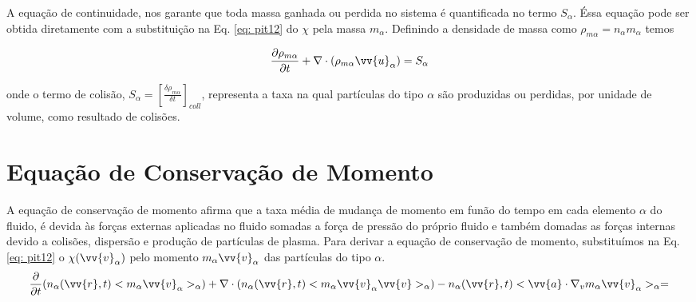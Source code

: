 \documentclass[12pt,oneside,a4paper]{abntex2}
\theoremstyle{definition}  %
\begin{document}
A equação de continuidade, nos garante que toda massa ganhada ou perdida no sistema é quantificada no termo $S_\alpha$.
Éssa equação pode ser obtida diretamente com a substituição na Eq. \ref{eq: pit12} do $\chi$ pela massa $m_\alpha$. Definindo a densidade de massa como $ \rho_{m\alpha} = n_\alpha m_\alpha$ temos

\begin{equation}
\label{eq: pit13}
\frac{\partial \rho_{m\alpha}}{\partial t} + \nabla \cdot (\rho_{m\alpha} \vv{u}_\alpha)  = S_\alpha 
\end{equation}

onde o termo de colisão, $S_\alpha = \left[\frac{\delta \rho_{m\alpha}}{\delta t}\right]_{coll}$, representa a taxa na qual partículas do tipo $\alpha$ são produzidas ou perdidas, por unidade de volume, como resultado de colisões.

\section{Equação de Conservação de Momento}
A equação de conservação de momento afirma que a taxa média de mudança de momento em funão do tempo em cada elemento $\alpha$ do fluido, é devida às forças externas aplicadas no fluido somadas a força de pressão do próprio fluido e também domadas as forças internas devido a colisões, dispersão e produção de partículas de plasma.
Para derivar a equação de conservação de momento, substituímos na Eq. \ref{eq: pit12} o $\chi (\vv{v}_\alpha)$ pelo momento $m_\alpha \vv{v}_\alpha$ das partículas do tipo $\alpha$. 
\begin{equation}
\label{eq: p2}
\frac{\partial }{\partial t}(n_\alpha(\vv{r},t)<m_\alpha \vv{v}_\alpha>_\alpha) + \nabla \cdot (n_\alpha(\vv{r},t)<m_\alpha \vv{v}_\alpha \vv{v} >_\alpha) - n_\alpha(\vv{r},t)<\vv{a} \cdot \nabla_v m_\alpha \vv{v}_\alpha>_\alpha = 
\end{equation}
\end{document}
